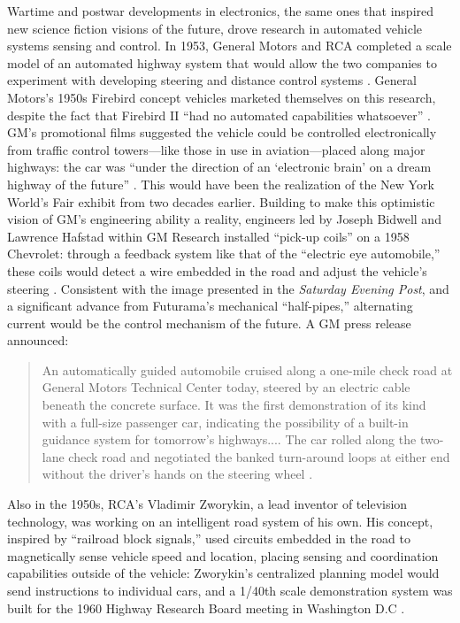 Wartime and postwar developments in electronics, the same ones that
inspired new science fiction visions of the future, drove
research in automated vehicle systems sensing and control. In 1953, General
Motors and RCA completed a scale model of an automated highway system
that would allow the two companies to experiment
with developing steering and distance control systems \cite[p. 6]{wetmore}.
General Motors's 1950s Firebird concept
vehicles marketed themselves on this research, despite the fact that
Firebird II ``had no automated capabilities whatsoever'' \cite[p. 7]{wetmore}. GM's
promotional films suggested the vehicle could be controlled
electronically from traffic control towers---like those in use in
aviation---placed along major highways: the car was ``under the direction
of an `electronic brain' on a dream highway of the future'' \cite[p.
  7]{wetmore}. This 
would have been the realization of the New York World's Fair exhibit
from two decades earlier. Building to make
this optimistic vision of GM's engineering ability a reality,
engineers led by Joseph Bidwell and Lawrence Hafstad within GM
Research installed ``pick-up coils'' on a 1958 Chevrolet: through a
feedback system like that of the ``electric eye automobile,'' these
coils would detect a wire embedded in the road and adjust the
vehicle's steering \cite[p. 7]{wetmore}. Consistent with the image presented in
the \emph{Saturday Evening Post}, and a significant advance from
Futurama's mechanical ``half-pipes,'' alternating current would
be the control mechanism of the future. A GM press release announced:
\begin{quote}
An automatically guided automobile cruised along a one-mile check road
at General Motors Technical Center today, steered by an electric cable
beneath the concrete surface. It was the first demonstration of its
kind with a full-size passenger car, indicating the possibility of a
built-in guidance system for tomorrow's highways.... The car rolled
along the two-lane check road and negotiated the banked turn-around
loops at either end without the driver's hands on the steering wheel
\cite[p. 7]{wetmore}.
\end{quote}
 Also in the 1950s, RCA's
Vladimir Zworykin, a lead inventor of television technology, was
working on an intelligent road system of his own. His concept,
inspired by ``railroad block signals,'' used circuits embedded in the
road to magnetically sense vehicle speed and location, placing sensing
and coordination capabilities outside of the vehicle:  Zworykin's
centralized planning model would send 
instructions to individual cars, and a 1/40th scale demonstration
system was built for the 1960 Highway Research Board meeting in
Washington D.C \cite[p. 9]{wetmore}.

